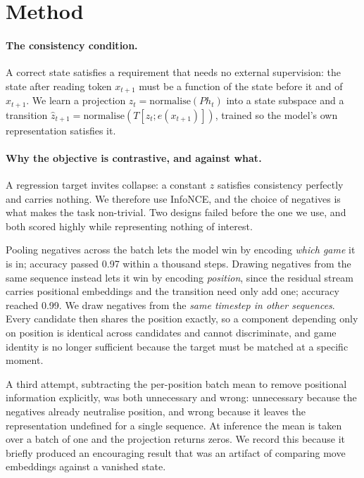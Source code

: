 \documentclass[11pt]{article}
\begin{document}
\section{Method}

\paragraph{The consistency condition.} A correct state satisfies a requirement
that needs no external supervision: the state after reading token $x_{t+1}$ must
be a function of the state before it and of $x_{t+1}$. We learn a projection
$z_t = \mathrm{normalise}(P h_t)$ into a state subspace and a transition
$\hat{z}_{t+1} = \mathrm{normalise}(T[z_t; e(x_{t+1})])$, trained so the model's
own representation satisfies it.

\paragraph{Why the objective is contrastive, and against what.} A regression
target invites collapse: a constant $z$ satisfies consistency perfectly and
carries nothing. We therefore use InfoNCE, and the choice of negatives is what
makes the task non-trivial. Two designs failed before the one we use, and both
scored highly while representing nothing of interest.

Pooling negatives across the batch lets the model win by encoding \emph{which
game} it is in; accuracy passed 0.97 within a thousand steps. Drawing negatives
from the same sequence instead lets it win by encoding \emph{position}, since the
residual stream carries positional embeddings and the transition need only add
one; accuracy reached 0.99. We draw negatives from the \emph{same timestep in
other sequences}. Every candidate then shares the position exactly, so a
component depending only on position is identical across candidates and cannot
discriminate, and game identity is no longer sufficient because the target must
be matched at a specific moment.

A third attempt, subtracting the per-position batch mean to remove positional
information explicitly, was both unnecessary and wrong: unnecessary because the
negatives already neutralise position, and wrong because it leaves the
representation undefined for a single sequence. At inference the mean is taken
over a batch of one and the projection returns zeros. We record this because it
briefly produced an encouraging result that was an artifact of comparing move
embeddings against a vanished state.
\end{document}
